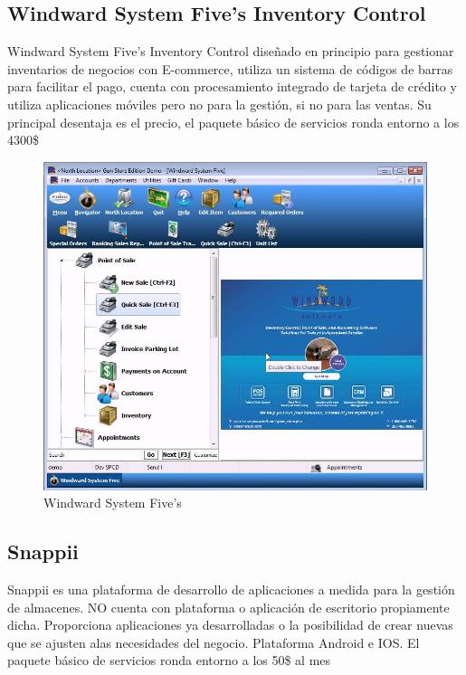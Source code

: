 \documentclass[a4paper,11pt]{book}
\begin{document}
\subsection{Windward System Five's Inventory Control}


Windward System Five's Inventory Control\cite{wws} diseñado en principio para gestionar inventarios de negocios con E-commerce, utiliza un sistema de códigos de barras para facilitar el pago, cuenta con procesamiento integrado de tarjeta de crédito y utiliza aplicaciones móviles pero no para la gestión, si no para las ventas. Su principal desentaja es el precio, el paquete básico de servicios ronda entorno a los 4300\$

\begin{figure}[H]  
\centering 
\includegraphics[scale=0.35]{imagenes/estudioArte/five.jpg}
\caption{Windward System Five's}  
\end{figure}

\subsection{Snappii}

Snappii\cite{snp} es una plataforma de desarrollo de aplicaciones a medida para la gestión de almacenes. NO cuenta con plataforma o aplicación de escritorio propiamente dicha. Proporciona aplicaciones ya desarrolladas o la posibilidad de crear nuevas que se ajusten alas necesidades del negocio. Plataforma Android e IOS. El paquete básico de servicios ronda entorno a los 50\$ al mes
\end{document}
